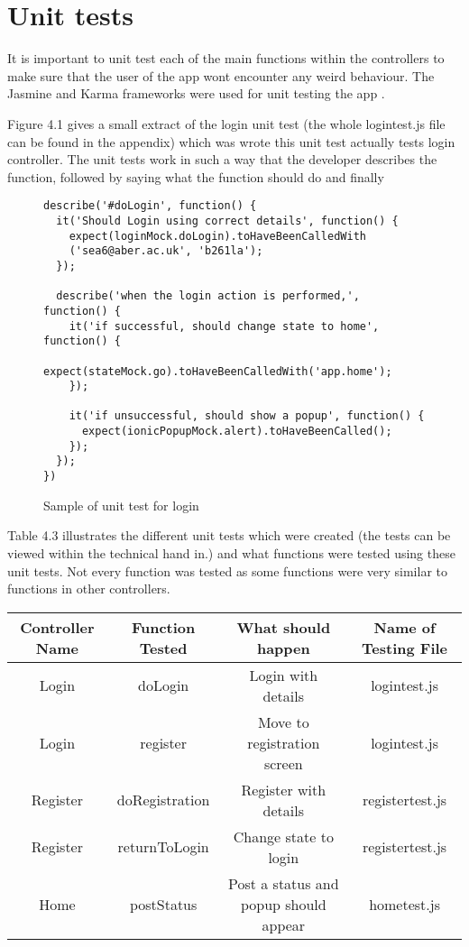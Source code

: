 \section{Unit tests}
It is important to unit test each of the main functions within the controllers to make sure that the user of the app wont encounter any weird behaviour. The Jasmine and Karma frameworks were used for unit testing the app \cite{testing}.

Figure 4.1 gives a small extract of the login unit test (the whole logintest.js file can be found in the appendix) which was wrote this unit test actually tests login controller. The unit tests work in such a way that the developer describes the function, followed by saying what the function should do and finally 

\begin{figure}[H]

\begin{verbatim}
describe('#doLogin', function() {
  it('Should Login using correct details', function() {
    expect(loginMock.doLogin).toHaveBeenCalledWith
    ('sea6@aber.ac.uk', 'b261la'); 
  });

  describe('when the login action is performed,', function() {
    it('if successful, should change state to home', function() {
      expect(stateMock.go).toHaveBeenCalledWith('app.home');
    });

    it('if unsuccessful, should show a popup', function() {
      expect(ionicPopupMock.alert).toHaveBeenCalled();
    });
  });
})
\end{verbatim}
\caption{Sample of unit test for login}
\end{figure}

Table 4.3 illustrates the different unit tests which were created (the tests can be viewed within the technical hand in.) and what functions were tested using these unit tests. Not every function was tested as some functions were very similar to functions in other controllers.

\begin{tabular} {||c c c c||}  
\hline
 Controller Name & Function Tested & What should happen & Name of Testing File\\
 \hline
 \hline 
 Login & doLogin & Login with details & logintest.js \\
 \hline
 Login & register &Move to registration screen & logintest.js \\
 \hline
 Register & doRegistration & Register with details & registertest.js \\
 \hline
 Register & returnToLogin & Change state to login & registertest.js \\
 \hline
 Home & postStatus & Post a status and popup should appear & hometest.js \\
 \hline
 \end{tabular}


